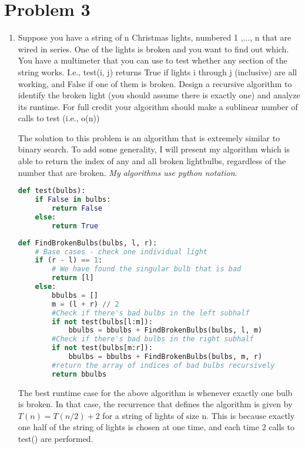 \documentclass[11pt, letterpaper]{article}
\begin{document}
\pagebreak
\section*{Problem 3}

\begin{enumerate}[label=(\alph*)]
\item  Suppose you have a string of n Christmas lights, numbered 1 ,..., n that are wired in series. One of the lights is broken and you want to find out which. You have a multimeter that you can use to test whether any section of the string works. I.e., test(i, j) returns True if lights i through j (inclusive) are all working, and False if one of them is broken. Design a recursive algorithm to identify the broken light (you should assume there is exactly one) and analyze its runtime. For full credit your algorithm should make a sublinear number of calls to test (i.e., o(n))

\quad The solution to this problem is an algorithm that is extremely similar to binary search. To add some generality, I will present my algorithm which is able to return the index of any and all broken lightbulbs, regardless of the number that are broken. \textit{My algorithms use python notation}.

\begin{lstlisting}[language=python]
def test(bulbs):
    if False in bulbs:
        return False
    else:
        return True
\end{lstlisting}

\begin{lstlisting}[language=python]
def FindBrokenBulbs(bulbs, l, r):
    # Base cases - check one individual light
    if (r - l) == 1:
        # We have found the singular bulb that is bad
        return [l]
    else:
        bbulbs = []
        m = (l + r) // 2
        #Check if there's bad bulbs in the left subhalf
        if not test(bulbs[l:m]):
            bbulbs = bbulbs + FindBrokenBulbs(bulbs, l, m)
        #Check if there's bad bulbs in the right subhalf
        if not test(bulbs[m:r]):
            bbulbs = bbulbs + FindBrokenBulbs(bulbs, m, r)
        #return the array of indices of bad bulbs recursively
        return bbulbs
\end{lstlisting}

\quad The best runtime case for the above algorithm is whenever exactly one bulb is broken. In that case, the recurrence that defines the algorithm is given by $T(n) = T(n / 2) + 2$ for a string of lights of size n. This is because exactly one half of the string of lights is chosen at one time, and each time 2 calls to test() are performed. 


\end{enumerate}
\end{document}
